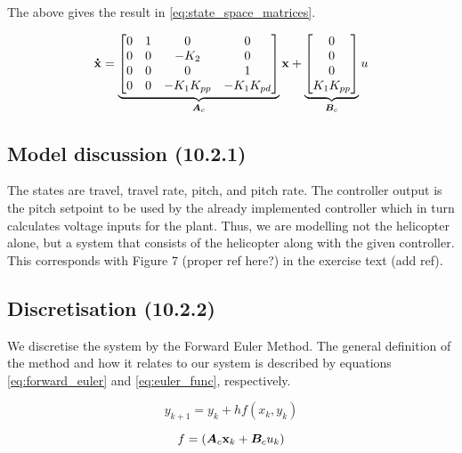 The above gives the result in \eqref{eq:state_space_matrices}.

\begin{equation}\label{eq:state_space_matrices}
	\mathbf{\dot{x}} =
	\underbrace{
		\begin{bmatrix}
			0 & 1 & 0 				& 0 \\
			0 & 0 & -K_{2} 			& 0 \\
			0 & 0 & 0 				& 1 \\
			0 & 0 & -K_{1}K_{pp}	& -K_{1}K_{pd}
		\end{bmatrix}
	}_{\bm{A}_{c}}
	\mathbf{x} +
	\underbrace{
		\begin{bmatrix}
			0 \\ 0 \\ 0 \\ K_{1}K_{pp}
		\end{bmatrix}
	}_{\bm{B}_{c}}
	u
\end{equation}


\subsection{Model discussion (10.2.1)}
The states are travel, travel rate, pitch, and pitch rate. The controller output is the pitch setpoint to be used by the already implemented controller which in turn calculates voltage inputs for the plant. Thus, we are modelling not the helicopter alone, but a system that consists of the helicopter along with the given controller. This corresponds with Figure 7 (proper ref here?) in the exercise text (add ref).


\subsection{Discretisation (10.2.2)}\label{sec:disc1}
We discretise the system by the Forward Euler Method. The general definition of the method and how it relates to our system is described by equations \eqref{eq:forward_euler} and \eqref{eq:euler_func}, respectively.

\begin{equation}\label{eq:forward_euler}
	y_{k+1} = y_{k} + h f(x_{k}, y_{k})
\end{equation}

\begin{equation}\label{eq:euler_func}
	f = \left( \bm{A}_{c} \mathbf{x}_{k} + \bm{B}_c u_{k} \right)
\end{equation}

